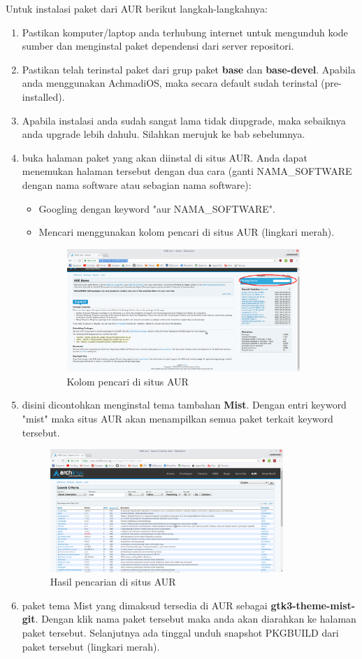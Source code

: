 \documentclass[12pt,]{article}
\begin{document}
	Untuk instalasi paket dari AUR berikut langkah-langkahnya:
	\begin{enumerate}
		\item Pastikan komputer/laptop anda terhubung internet untuk mengunduh kode sumber dan menginstal paket dependensi dari server repositori.
		\item Pastikan telah terinstal paket dari grup paket \textbf{base} dan \textbf{base-devel}.
		Apabila anda menggunakan AchmadiOS, maka secara default sudah terinstal (pre-installed).		
		\item Apabila instalasi anda sudah sangat lama tidak diupgrade, maka sebaiknya anda upgrade lebih dahulu.
		Silahkan merujuk ke bab sebelumnya.
		\item buka halaman paket yang akan diinstal di situs AUR.
		Anda dapat menemukan halaman tersebut dengan dua cara
		(ganti NAMA\_SOFTWARE dengan nama software atau sebagian nama software):
		\begin{itemize}
			\item Googling dengan keyword "aur NAMA\_SOFTWARE". 
			\item Mencari menggunakan kolom pencari di situs AUR (lingkari merah).
			\begin{figure}[h]
				\centering
				\includegraphics[width=250pt]{aur/cari}
				\caption{Kolom pencari di situs AUR}
			\end{figure}
		\end{itemize}
		\newpage
		\item disini dicontohkan menginstal tema tambahan \textbf{Mist}.
		Dengan entri keyword "mist" maka situs AUR akan menampilkan semua paket terkait keyword tersebut.
		\begin{figure}[h]
			\centering
			\includegraphics[width=250pt]{aur/list}
			\caption{Hasil pencarian di situs AUR}
		\end{figure}
		\item paket tema Mist yang dimaksud tersedia di AUR sebagai \textbf{gtk3-theme-mist-git}.
		Dengan klik nama paket tersebut maka anda akan diarahkan ke halaman paket tersebut.
		Selanjutnya ada tinggal unduh snapshot PKGBUILD dari paket tersebut (lingkari merah).
		

\end{enumerate}
\end{document}

